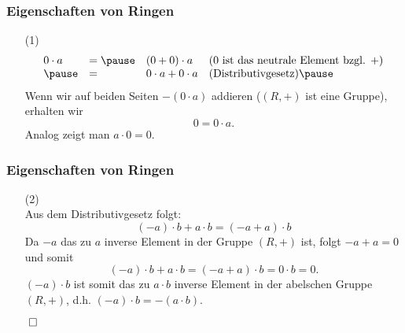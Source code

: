 %
%
\begin{frame}\frametitle{Eigenschaften von Ringen} 
	
	\begin{itemize}
		\item[(1)] 
			$$
			\begin{array}{llll}
				0\cdot a	&=\pause	&(0+0)\cdot a		&\text{($0$ ist das neutrale Element bzgl. $+$)}	\\ \pause
						&=	&0\cdot a + 0\cdot a	&\text{(Distributivgesetz)} 			\pause		
			\end{array}
			$$
			Wenn wir auf beiden Seiten $-(0\cdot a)$ addieren ($(R,+)$ ist eine Gruppe), erhalten wir
			$$
				0 = 0\cdot a.
			$$\pause
			Analog zeigt man $a\cdot 0 = 0$.
	\end{itemize}	
		
\end{frame}
%
%
\begin{frame}\frametitle{Eigenschaften von Ringen} 
	
	\begin{itemize}
		\item[(2)]  \\
		Aus dem Distributivgesetz folgt:
			$$
				(-a)\cdot b + a\cdot b = ( -a + a)\cdot b
			$$
			\pause
			Da $-a$ das zu $a$ inverse Element in der Gruppe $(R,+)$ ist, folgt $-a + a = 0$ und somit
			$$
				(-a)\cdot b + a\cdot b= ( -a + a)\cdot b = 0\cdot b = 0.
			$$
			\pause
			$(-a)\cdot b$ ist somit das zu $a\cdot b$ inverse Element in der abelschen Gruppe $(R,+)$, d.h.
			$(-a)\cdot b = -(a\cdot b)$.
	\end{itemize}	
	\hfill$\qed$
	
\end{frame}
%
